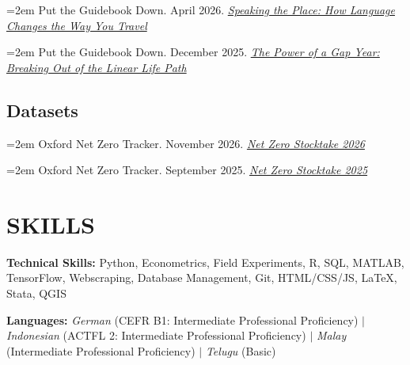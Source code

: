 \documentclass[a4paper,9pt]{extarticle}
\newcommand{\presitem}[3]{%
\noindent\hangindent=2em\hangafter=1
  #1. #2. \textit{#3}\par\vspace{4pt}%
}
\begin{document}
    
\presitem{Put the Guidebook Down}{April 2026}{\href{https://open.spotify.com/episode/5pUa7CEhtBdIxU1TMm6Mwv?si=SMSwn-V3RhC-P7_yMjGHmQ
}{Speaking the Place: How Language Changes the Way You Travel}}
\presitem{Put the Guidebook Down}{December 2025}{\href{https://open.spotify.com/episode/7b4w5RMeKO1g6JYgzNwgYc?si=c1360d81a4894d30
}{The Power of  a Gap Year: Breaking Out of the Linear Life Path}}

    \subsection*{Datasets}
    \presitem{Oxford Net Zero Tracker}{November 2026}{\href{https://zenodo.org/records/23888985}{Net Zero Stocktake 2026}}
    \presitem{Oxford Net Zero Tracker}{September 2025}{\href{https://zenodo.org/records/17143240
}{Net Zero Stocktake 2025}}


\section*{SKILLS}

\noindent\textbf{Technical Skills:} Python, Econometrics, Field Experiments, R, SQL, MATLAB, TensorFlow, Webscraping, Database Management, Git, HTML/CSS/JS, LaTeX, Stata, QGIS

\vspace{4pt}

\noindent\textbf{Languages:} \textit{German} (CEFR B1: Intermediate Professional Proficiency) $|$ \textit{Indonesian} (ACTFL 2: Intermediate Professional Proficiency) $|$ \textit{Malay} (Intermediate Professional Proficiency) $|$ \textit{Telugu} (Basic)



\end{document}

